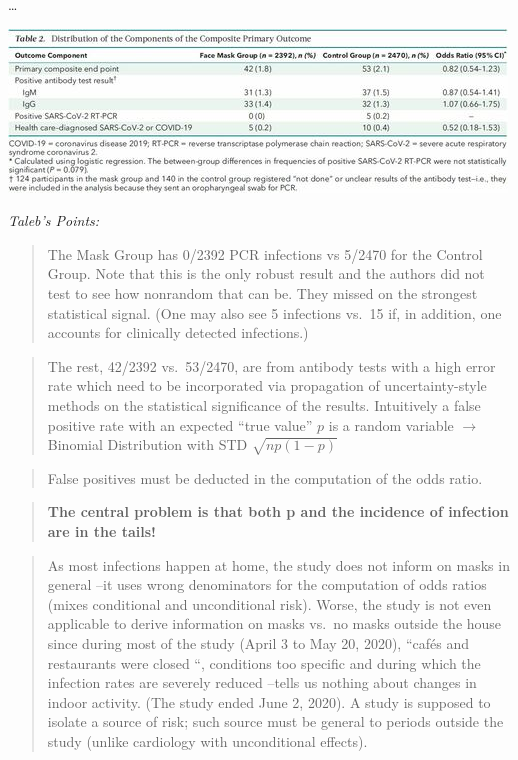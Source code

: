 \documentclass[
]{book}
\begin{document}
\ldots{}

\includegraphics{fig/Bundgaard_Outcome_Components.jpg}

\emph{Taleb's Points:}

\begin{quote}
The Mask Group has 0/2392 PCR infections vs 5/2470 for the Control Group. Note that this is the only robust result and the authors did not test to see how nonrandom that can be. They missed on the strongest statistical signal. (One may also see 5 infections vs.~15 if, in addition, one accounts for clinically detected infections.)
\end{quote}

\begin{quote}
The rest, 42/2392 vs.~53/2470, are from antibody tests with a high error rate
which need to be incorporated via propagation of uncertainty-style methods
on the statistical significance of the results.
Intuitively a false positive rate with an expected ``true value'' \(p\)
is a random variable \(\rightarrow\) Binomial Distribution with STD \(\sqrt{n p (1-p)}\)
\end{quote}

\begin{quote}
False positives must be deducted in the computation of the odds ratio.
\end{quote}

\begin{quote}
\textbf{The central problem is that both p and the incidence of infection are in the tails!}
\end{quote}

\begin{quote}
As most infections happen at home, the study does not inform on masks in general --it uses wrong denominators for the computation of odds ratios (mixes conditional and unconditional risk). Worse, the study is not even applicable to derive information on masks vs.~no masks outside the house since during most of the study (April 3 to May 20, 2020), ``cafés and restaurants were closed ``, conditions too specific and during which the infection rates are severely reduced --tells us nothing about changes in indoor activity. (The study ended June 2, 2020). A study is supposed to isolate a source of risk; such source must be general to periods outside the study (unlike cardiology with unconditional effects).
\end{quote}
\end{document}
